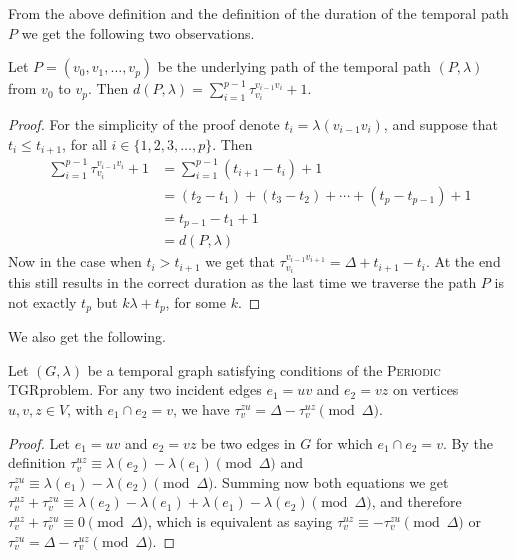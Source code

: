 \documentclass[a4paper,UKenglish,cleveref, autoref, thm-restate]{lipics-v2021}
\newcommand{\deltaExact}{\textsc{Periodic TGR}}
\begin{document}
    From the above definition and the definition of the duration of the temporal path $P$ we get the following two observations.
    \begin{observation}\label{obs:durationPwithWaitingTimes}
        Let $P = (v_0, v_1, \dots, v_p)$ be the underlying path of the temporal path
        $(P, \lambda)$ from $v_0$ to $v_p$.
        Then $d(P,\lambda) = \sum_{i = 1}^{p-1} \tau_{v_i}^{v_{i-1}v_i} + 1 $.
    \end{observation}
    \begin{proof}
        For the simplicity of the proof denote $t_i = \lambda(v_{i-1}v_i)$, and suppose that $t_i \leq t_{i+1}$, for all $i \in \{1,2,3,\dots,p\}$.
        Then
        \begin{align*}
        \sum_{i = 1}^{p-1} \tau_{v_i}^{v_{i-1}v_i} + 1  
        &= \sum _{i = 1}^{p-1} (t_{i+1} - t_i) + 1 \\
        & = (t_2 - t_1) + (t_3 - t_2) + \cdots + (t_p - t_{p-1}) + 1  \\
        & = t_{p-1} - t_1 + 1\\
        & = d(P, \lambda)
        \end{align*}
        Now in the case when $t_i > t_{i+1}$ we get that $\tau_{v_i}^{v_{i-1}v_{i+1}} = \Delta + t_{i+1} - t_i$.
        At the end this still results in the correct duration as the last time we traverse the path $P$ is not exactly $t_p$ but $k \lambda + t_p$, for some $k$.
    \end{proof}
    We also get the following.
    \begin{observation}\label{obs:travel-delays-both-directions}
    Let $(G, \lambda)$ be a temporal graph satisfying conditions of the \deltaExact problem.
    For any two incident edges $e_1 = uv$ and $e_2 = vz$ on vertices $u,v,z \in V$, with $e_1 \cap e_2 = v$, we have $\tau_v^{zu} = \Delta - \tau_v^{uz} \pmod \Delta$.
    \end{observation}
    
    \begin{proof}
        Let $e_1 = uv$ and $e_2 = vz$ be two edges in $G$ for which $e_1 \cap e_2 = v$. 
        By the definition $\tau_v^{uz} \equiv \lambda (e_2) - \lambda(e_1) \pmod \Delta$ and $\tau_v^{zu} \equiv \lambda (e_1) - \lambda(e_2) \pmod \Delta$.
        Summing now both equations we get $\tau_v^{uz} + \tau_v^{zu} \equiv \lambda(e_2) - \lambda(e_1) + \lambda (e_1) - \lambda(e_2) \pmod \Delta$, and therefore $\tau_v^{uz} + \tau_v^{zu} \equiv 0 \pmod \Delta$, which is equivalent as saying $\tau_v^{uz} \equiv - \tau_v^{zu} \pmod \Delta$ or $\tau_v^{zu} = \Delta - \tau_v^{uz} \pmod \Delta$.
    \end{proof}
\end{document}
